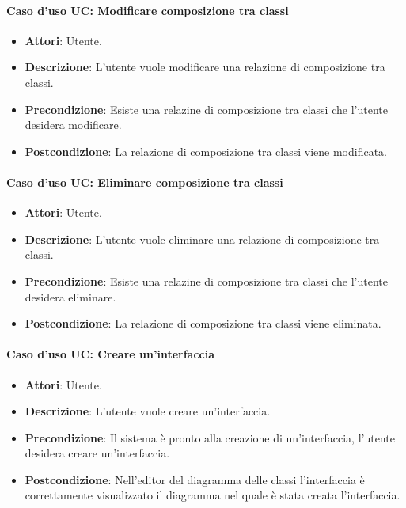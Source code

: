 \paragraph{Caso d'uso UC:  Modificare composizione tra classi}
\begin{itemize}
	\item\textbf{Attori}: Utente.
	\item\textbf{Descrizione}: L'utente vuole modificare una relazione di composizione tra classi.
	\item\textbf{Precondizione}: Esiste una relazine di composizione tra classi che l'utente desidera modificare.
	\item\textbf{Postcondizione}: La relazione di composizione tra classi viene modificata.
\end{itemize}

\paragraph{Caso d'uso UC: Eliminare composizione tra classi}
\begin{itemize}
	\item\textbf{Attori}: Utente.
	\item\textbf{Descrizione}: L'utente vuole eliminare una relazione di composizione tra classi.
	\item\textbf{Precondizione}: Esiste una relazine di composizione tra classi che l'utente desidera eliminare.
	\item\textbf{Postcondizione}: La relazione di composizione tra classi viene eliminata.
\end{itemize}

\paragraph{Caso d'uso UC: Creare un'interfaccia}
\begin{itemize}
	\item\textbf{Attori}: Utente.
	\item\textbf{Descrizione}: L'utente vuole creare un'interfaccia.
	\item\textbf{Precondizione}: Il sistema è pronto alla creazione di un'interfaccia, l'utente desidera creare un'interfaccia.
	\item\textbf{Postcondizione}: Nell'editor del diagramma delle classi l'interfaccia è correttamente visualizzato il diagramma nel quale è stata creata l'interfaccia.
\end{itemize}
